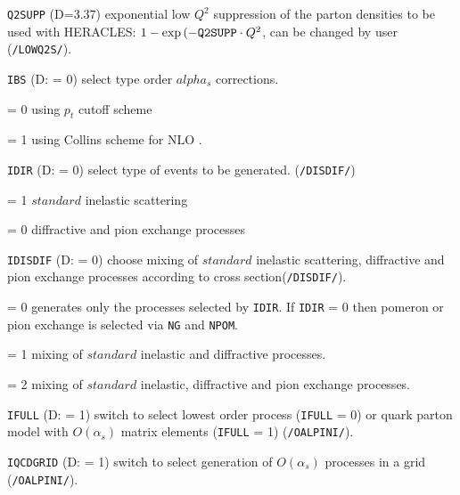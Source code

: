 \documentclass[10pt]{article} \usepackage{dina4}
\newcommand{\deflab}[1]{#1\hfil}%
\newenvironment{defl}[1]%
  {\begin{list}{}{\settowidth{\labelwidth}{#1}%
  \setlength{\leftmargin}{\labelwidth}%
  \addtolength{\leftmargin}{\labelsep}%
  \setlength{\itemsep}{0pt plus 1pt}
  \setlength{\parsep}{0pt plus 1pt}
  \setlength{\topsep}{0pt plus 1pt}
  \setlength{\partopsep}{0pt plus 1pt}
  \setlength{\parskip}{2mm plus 1mm minus 1mm}
  \let\makelabel\deflab}}%
  {\end{list}}
\begin{document}
\begin{defl}{123456789012345}
\item[{\tt Q2SUPP}] (D=3.37)  exponential low $Q^2$ suppression 
                      of the parton
                      densities to be used with HERACLES:
                      $1-\exp{(-\verb+Q2SUPP+\cdot Q^2}$, can be
                     changed by user (\verb+/LOWQ2S/+).

\item[{\tt IBS}]  
(D: = 0) select type order $alpha_s$ corrections. 
\item[]                    = 0 using $p_t$ cutoff scheme
\item[]                    = 1 using Collins scheme for NLO 
             \cite{Collins-collfac,Collins-collfac2} 
         .
                 
\item[{\tt IDIR}]  
(D: = 0) select type of events to be generated.
                 (\verb+/DISDIF/+) 
\item[]                    = 1 $standard$ inelastic scattering 
\item[]                    = 0 diffractive and pion exchange processes
\item[{\tt IDISDIF}]
  (D: = 0) choose mixing of $standard$ inelastic
                    scattering, diffractive and pion exchange processes
                    according to cross section(\verb+/DISDIF/+).
\item[]                    = 0 generates only the processes selected
                    by \verb+IDIR+. 
                   If \verb+IDIR+ = 0 then pomeron or pion exchange 
                    is selected via \verb+NG+ and \verb+NPOM+.  
\item[]                    = 1 mixing of $standard$ inelastic and diffractive 
                    processes.  
\item[]                    = 2 mixing of $standard$ inelastic, diffractive and
                    pion exchange processes.
\item[{\tt IFULL}]
                   (D: = 1) switch to select lowest order process
                   (\verb+IFULL+ = 0) or quark parton model with 
                   $O(\alpha_s)$  matrix elements (\verb+IFULL+ = 1)
			 (\verb+/OALPINI/+).
\item[{\tt IQCDGRID}]
                   (D: = 1) switch to select 
                   generation of $O(\alpha_s)$ processes in a grid
                   (\verb+/OALPINI/+). 



\end{defl}
\end{document}
